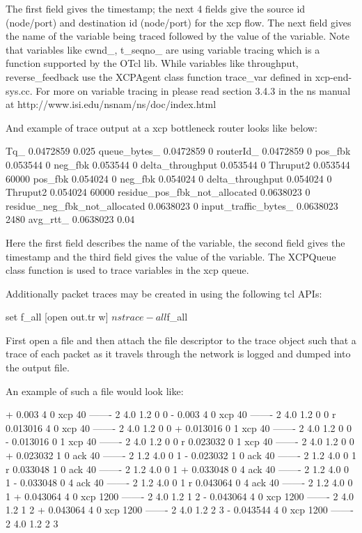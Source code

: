   The first field gives the timestamp; the next 4 fields give the
  source id (node/port) and destination id (node/port) for the xcp
  flow. The next field gives the name of the variable being traced
  followed by the value of the variable. Note that variables like 
  cwnd\_, t\_seqno\_ are using variable tracing which is a function
  supported by the OTcl lib. While variables like throughput,
  reverse\_feedback use the XCPAgent class function trace\_var defined
  in xcp-end-sys.cc. For more on variable tracing in \ns{} please read
  section 3.4.3 in the ns manual at
  http://www.isi.edu/nsnam/ns/doc/index.html  
    
    
  And example of trace output at a xcp bottleneck router looks like below:
  \begin{program}
    Tq_ 0.0472859 0.025
    queue_bytes_ 0.0472859 0
    routerId_ 0.0472859 0
    pos_fbk 0.053544 0
    neg_fbk 0.053544 0
    delta_throughput 0.053544 0
    Thruput2 0.053544 60000
    pos_fbk 0.054024 0
    neg_fbk 0.054024 0
    delta_throughput 0.054024 0
    Thruput2 0.054024 60000
    residue_pos_fbk_not_allocated 0.0638023 0
    residue_neg_fbk_not_allocated 0.0638023 0
    input_traffic_bytes_ 0.0638023 2480
    avg_rtt_ 0.0638023 0.04
  \end{program}
  
  Here the first field describes the name of the variable, the
  second field gives the timestamp and the third field gives the
  value of the variable. The XCPQueue class function 
  is used to trace variables in the xcp queue.
  
  Additionally packet traces may be created in \ns{} using the following
  tcl APIs:
  \begin{program}
    set f_all [open out.tr w]
    $ns trace-all $f_all
  \end{program}
  
  First open a file and then attach the file descriptor to the \ns{}
  trace object such that a trace of each packet as it travels through
  the network is logged and dumped into the output file.
  
  An example of such a file would look like:
  \begin{program}
    + 0.003 4 0 xcp 40 ------- 2 4.0 1.2 0 0
    - 0.003 4 0 xcp 40 ------- 2 4.0 1.2 0 0
    r 0.013016 4 0 xcp 40 ------- 2 4.0 1.2 0 0
    + 0.013016 0 1 xcp 40 ------- 2 4.0 1.2 0 0
    - 0.013016 0 1 xcp 40 ------- 2 4.0 1.2 0 0
    r 0.023032 0 1 xcp 40 ------- 2 4.0 1.2 0 0
    + 0.023032 1 0 ack 40 ------- 2 1.2 4.0 0 1
    - 0.023032 1 0 ack 40 ------- 2 1.2 4.0 0 1
    r 0.033048 1 0 ack 40 ------- 2 1.2 4.0 0 1
    + 0.033048 0 4 ack 40 ------- 2 1.2 4.0 0 1
    - 0.033048 0 4 ack 40 ------- 2 1.2 4.0 0 1
    r 0.043064 0 4 ack 40 ------- 2 1.2 4.0 0 1
    + 0.043064 4 0 xcp 1200 ------- 2 4.0 1.2 1 2
    - 0.043064 4 0 xcp 1200 ------- 2 4.0 1.2 1 2
    + 0.043064 4 0 xcp 1200 ------- 2 4.0 1.2 2 3
    - 0.043544 4 0 xcp 1200 ------- 2 4.0 1.2 2 3
  \end{program}

